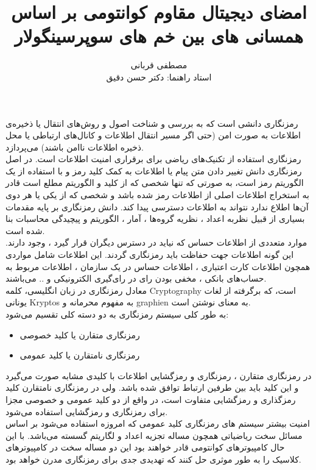 \documentclass[12pt,a4paper]{book}
\title{امضای دیجیتال مقاوم کوانتومی بر اساس همسانی های بین خم های سوپرسینگولار}
\author{مصطفی قربانی
	\\[1cm]{ استاد راهنما: دکتر حسن دقیق}}
\date{}
\begin{document}
	\maketitle
	
رمزنگاری دانشی است که به بررسی و شناخت اصول و روش‌های انتقال یا ذخیره‌ی اطلاعات به صورت امن (حتی اگر مسیر انتقال اطلاعات و کانال‌های ارتباطی یا محل ذخیره اطلاعات ناامن باشند) می‌پردازد.
\\
رمزنگاری استفاده از تکنیک‌های ریاضی برای برقراری امنیت اطلاعات است. در اصل رمزنگاری دانش تغییر دادن متن پیام یا اطلاعات به کمک کلید رمز و با استفاده از یک الگوریتم رمز است، به صورتی که تنها شخصی که از کلید و الگوریتم مطلع است قادر به استخراج اطلاعات اصلی از اطلاعات رمز شده باشد و شخصی که از یکی یا هر دوی آن‌ها اطلاع ندارد نتواند به اطلاعات دسترسی پیدا کند. دانش رمزنگاری بر پایه مقدمات بسیاری از قبیل نظربه اعداد ، نظریه گروه‌ها ، آمار ، الگوریتم و پیچیدگی محاسبات بنا شده است.
\\
موارد متعددی از اطلاعات حساس که نیاید در دسترس دیگران قرار گیرد ، وجود دارند. این گونه اطلاعات جهت حفاظت باید رمزنگاری گردند. این اطلاعات شامل مواردی همچون اطلاعات کارت اعتباری ، اطلاعات حساس در یک سازمان ، اطلاعات مربوط به حساب‌های بانکی ، مخفی بودن رای در رای‌گیری الکترونیکی و .. می‌باشند.
\\
معادل رمزنگاری در زبان انگلیسی، کلمه 
Cryptography
است، که برگرفته از لغات یونانی 
Kryptos
به مفهوم محرمانه و 
graphien
به معنای نوشتن است.
\\
به طور کلی سیستم رمزنگاری به دو دسته کلی تقسیم می‌شود:
\begin{itemize}
	\item {رمزنگاری متقارن یا کلید خصوصی}
	\item {رمزنگاری نامتقارن یا کلید عمومی}
\end{itemize}
در رمزنگاری متقارن ، رمزنگاری و رمزگشایی اطلاعات با کلیدی مشابه صورت می‌گیرد و این کلید باید بین طرفین ارتباط توافق شده باشد. ولی در رمزنگاری نامتقارن کلید رمزگذاری و رمزگشایی متفاوت است، در واقع از دو کلید عمومی و خصوصی مجزا برای رمزنگاری و رمزگشایی استفاده می‌شود.
\\
امنیت بیشتر سیستم های رمزنگاری کلید عمومی که امروزه استفاده می‌شود بر اساس مسائل سخت ریاضیاتی همچون مساله تجزیه اعداد و لگاریتم گسسته می‌باشد. با این حال کامپیوترهای کوانتومی قادر خواهند بود این دو مساله سخت در کامپیوترهای کلاسیک را به طور موثری حل کنند که تهدیدی جدی برای رمزنگاری مدرن خواهد بود.
\\
\end{document}
